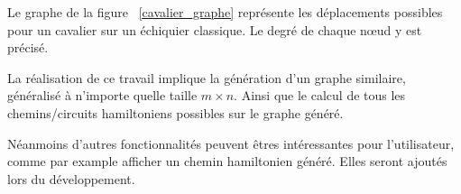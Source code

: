 Le graphe de la figure ~\ref{cavalier_graphe} représente les déplacements possibles pour un cavalier sur un échiquier classique. Le degré de chaque nœud y est précisé. 

La réalisation de ce travail implique la génération d'un graphe similaire, généralisé à n'importe quelle taille $m \times n$. Ainsi que le calcul de tous les chemins/circuits hamiltoniens possibles sur le graphe généré. 

Néanmoins d'autres fonctionnalités peuvent êtres intéressantes pour l'utilisateur, comme par example afficher un chemin hamiltonien généré. Elles seront ajoutés lors du développement.

